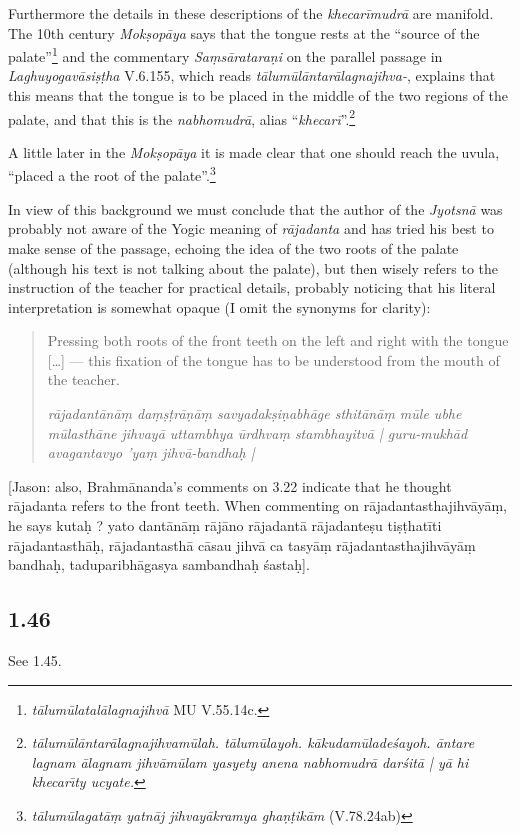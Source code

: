 \begin{ekdosis}
\begin{philcomm}[hp01_045]
Furthermore the details in these descriptions of the \emph{khecarīmudrā} are manifold. The 10th
century \emph{Mokṣopāya} says that the tongue rests at the ``source of the
palate''\footnote{\emph{tālumūlatalālagnajihvā} MU V.55.14c.} and the commentary
\emph{Saṃsārataraṇi} on the parallel passage in \emph{Laghuyogavāsiṣṭha} V.6.155, which reads
\emph{tālumūlāntarālagnajihva-}, explains that this means that the tongue is to be placed in the
middle of the two regions of the palate, and that this is the \emph{nabhomudrā}, alias
``\emph{khecarī}''.\footnote{\emph{tālumūlāntarālagnajihvamūlah. tālumūlayoh. kākudamūladeśayoh. āntare
  lagnam ālagnam jihvāmūlam yasyety anena nabhomudrā darśitā | yā hi khecarı̄ty ucyate.}}

A little later in the \emph{Mokṣopāya} it is made clear that one should reach the uvula, ``placed a
the root of the palate''.\footnote{\emph{tālumūlagatāṃ yatnāj jihvayākramya ghaṇṭikām}
(V.78.24ab)}

In view of this background we must conclude that the author of the \emph{Jyotsnā} was probably not
aware of the Yogic meaning of \emph{rājadanta} and has tried his best to make sense of the passage,
echoing the idea of the two roots of the palate (although his text is not talking about the
palate), but then wisely refers to the instruction of the teacher for practical details, probably
noticing that his literal interpretation is somewhat opaque (I omit the synonyms for clarity):

\begin{quote}
Pressing both roots of the front teeth on the left and right with the tongue [\ldots] — this fixation of the tongue has to be understood from the mouth of the teacher.

\emph{rājadantānāṃ daṃṣṭrāṇāṃ savyadakṣiṇabhāge sthitānāṃ mūle ubhe mūlasthāne jihvayā uttambhya ūrdhvaṃ stambhayitvā | guru-mukhād avagantavyo 'yaṃ jihvā-bandhaḥ |}
\end{quote}

[Jason: also, Brahmānanda’s comments on 3.22 indicate that he thought rājadanta refers to the front teeth. When commenting on rājadantasthajihvāyāṃ, he says kutaḥ ? yato dantānāṃ rājāno rājadantā rājadanteṣu tiṣṭhatīti rājadantasthāḥ, rājadantasthā cāsau jihvā ca tasyāṃ rājadantasthajihvāyāṃ bandhaḥ, taduparibhāgasya sambandhaḥ śastaḥ].
\end{philcomm}

\subsection*{1.46}
\begin{translation}[hp01_046]
See 1.45.
\end{translation}


\end{ekdosis}
